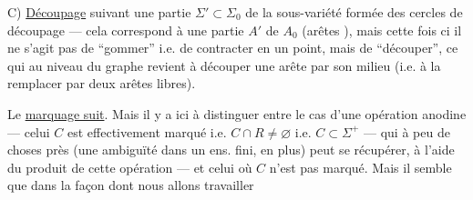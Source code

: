 
C) \uline{Découpage}  suivant une partie 
$\Sigma'\subset\Sigma_0$ de la sous-variété formée des cercles de découpage --- cela correspond à une partie $A'$ de $A_0$ (arêtes  ), mais cette fois ci il ne s'agit pas de ``gommer'' i.e. de contracter en un point, mais de ``découper'', ce qui au niveau du graphe revient à découper une arête par son milieu (i.e. à la remplacer par deux arêtes libres).

Le \uline{marquage suit}. 
Mais il y a ici à distinguer entre le cas d'une opération anodine  --- celui
$C$ est effectivement marqué i.e. $C\cap R\ne\varnothing$ i.e. $C\subset\Sigma^+$ --- qui à peu de choses près (une ambiguïté dans un ens. fini, \deleted{)} en plus) peut se récupérer, à l'aide du produit de cette opération --- et celui où $C$ n'est pas marqué.
Mais il semble que dans la façon dont nous allons travailler
